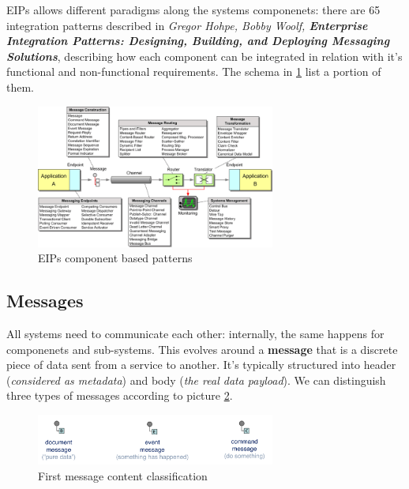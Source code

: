 \documentclass[10pt,a4paper]{report}
\begin{document}
EIPs allows different paradigms along the systems componenets: there are 65 integration patterns described in \textit{Gregor Hohpe, Bobby Woolf, \textbf{Enterprise Integration Patterns: Designing, Building, and Deploying Messaging Solutions}}, describing how each component can be integrated in relation with it's functional and non-functional requirements. The schema in \ref{image34} list a portion of them. 
 \begin{figure}[h]
	\centering
	\includegraphics[width=0.7\textwidth]{image34}
	\caption{EIPs component based patterns}
	\label{image34}
\end{figure}

\subsection{Messages}
All systems need to communicate each other: internally, the same happens for componenets and sub-systems. This evolves around a \textbf{message} that is a discrete piece of data sent from a service to another. It's typically structured into header (\textit{considered as metadata}) and body (\textit{the real data payload}). We can distinguish three types of messages according to picture \ref{image35}.
 \begin{figure}[h]
	\centering
	\includegraphics[width=0.7\textwidth]{image35}
	\caption{First message content classification}
	\label{image35}
\end{figure}
\end{document}

